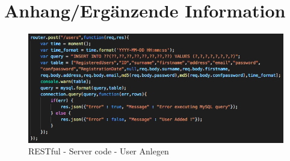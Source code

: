 %
%
% 
% 
\renewcommand*{\lstlistlistingname}{Codeverzeichnis}
\chapter{Anhang/Ergänzende Information}
\label{chap:app}
	\begin{figure}[h!]
		\centering
		\includegraphics[width=1\textwidth]{images/restfull-server-code.png}
		\caption{RESTful - Server code - User Anlegen}
		\label{fig:serversidecode}
	\end{figure}




\clearpage


\listoffigures

\clearpage


\lstlistoflistings

